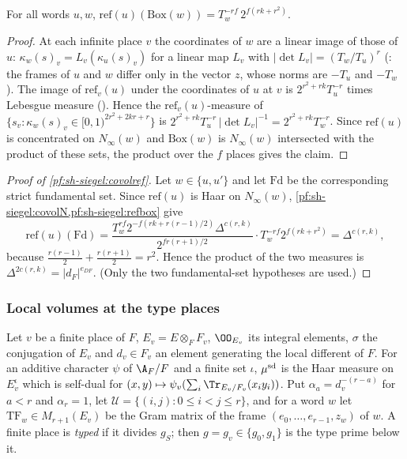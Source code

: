 \begin{proposition}\label{pf:sh-siegel:refbox}
For all words $u,w$, $\mathrm{ref}(u)(\mathrm{Box}(w))=T_w^{-rf}\,2^{f(rk+r^2)}$.
\end{proposition}

\begin{proof}
At each infinite place $v$ the coordinates of $w$ are a linear image of those of $u$: $\kappa_w(s)_v=L_v(\kappa_u(s)_v)$ for a
linear map $L_v$ with $|\det L_v|=(T_w/T_u)^r$ (: the frames of $u$ and
$w$ differ only in the vector $z$, whose norms are $-T_u$ and $-T_w$). The image of $\mathrm{ref}_v(u)$ under the coordinates of
$u$ at $v$ is $2^{r^2+rk}T_u^{-r}$ times Lebesgue measure (). Hence the
$\mathrm{ref}_v(u)$-measure of $\{s_v:\kappa_w(s)_v\in[0,1)^{2r^2+2kr+r}\}$ is
$2^{r^2+rk}T_u^{-r}\,|\det L_v|^{-1}=2^{r^2+rk}T_w^{-r}$. Since $\mathrm{ref}(u)$ is concentrated on $N_\infty(w)$ and
$\mathrm{Box}(w)$ is $N_\infty(w)$ intersected with the product of these sets, the product over the $f$ places gives the claim.
\end{proof}

\begin{proof}[Proof of \cref{pf:sh-siegel:covolref}]
Let $w\in\{u,u'\}$ and let $\mathrm{Fd}$ be the corresponding strict fundamental set. Since $\mathrm{ref}(u)$ is Haar on
$N_\infty(w)$, \cref{pf:sh-siegel:covolN,pf:sh-siegel:refbox} give
\[
\mathrm{ref}(u)(\mathrm{Fd})=\frac{T_w^{rf}2^{-f(rk+r(r-1)/2)}\Delta^{c(r,k)}}{2^{fr(r+1)/2}}\cdot T_w^{-rf}2^{f(rk+r^2)}=
\Delta^{c(r,k)},
\]
because $\frac{r(r-1)}2+\frac{r(r+1)}2=r^2$. Hence the product of the two measures is $\Delta^{2c(r,k)}=|d_F|^{e_{DF}}$. (Only the
two fundamental-set hypotheses are used.)
\end{proof}

\subsubsection{Local volumes at the type places}

Let $v$ be a finite place of $F$, $E_v=E\otimes_FF_v$, $\OO_{E_v}$ its integral elements, $\sigma$ the conjugation of $E_v$ and
$d_v\in F_v$ an element generating the local different of $F$. For an additive character $\psi$ of $\A_F/F$ and a finite set
$\iota$, $\mu^{\mathrm{sd}}$ is the Haar measure on $E_v^\iota$ which is self-dual for $(x,y)\mapsto\psi_v(\sum_i\Tr_{E_v/F_v}(x_iy_i))$.
Put $\alpha_a=d_v^{-(r-a)}$ for $a<r$ and $\alpha_r=1$, let $\mathcal U=\{(i,j):0\le i<j\le r\}$, and for a word $w$ let
$\mathrm{TF}_w\in M_{r+1}(E_v)$ be the Gram matrix of the frame $(e_0,\dots,e_{r-1},z_w)$ of $w$. A finite place is \emph{typed}
if it divides $g_S$; then $g=g_v\in\{g_0,g_1\}$ is the type prime below it.

